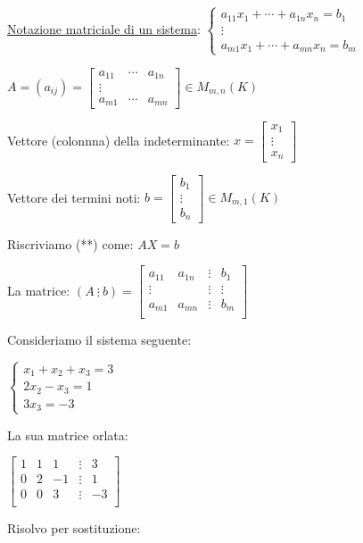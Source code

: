 \documentclass{article}
\newcommand{\ul}[1]{\underline{#1}}
\begin{document}
\ul{Notazione matriciale di un sistema}:
$\begin{cases}
		a_{11}x_1+\cdots+a_{1n}x_n=b_1 \\
		\vdots                         \\
		a_{m1}x_1+\cdots+a_{mn}x_n=b_m
	\end{cases}$

$A=(a_{ij})=\begin{bmatrix}
		a_{11} & \cdots & a_{1n} \\
		\vdots                   \\
		a_{m1} & \cdots & a_{mn}
	\end{bmatrix}\in M_{m,n}(K)$

Vettore (colonnna) della indeterminante:
$x=\begin{bmatrix}x_1\\\vdots\\x_n\end{bmatrix}$

Vettore dei termini noti: $b=\begin{bmatrix}b_1\\\vdots\\b_n\end{bmatrix}\in M_{m,1}(K)$

Riscriviamo (**) come:
$AX=b$

La matrice: $(A\ \vdots\ b)=\begin{bmatrix}
		a_{11} & a_{1n} & \vdots & b_1    \\
		\vdots &        & \vdots & \vdots \\
		a_{m1} & a_{mn} & \vdots & b_m    \\
	\end{bmatrix}$

Consideriamo il sistema seguente:

$\begin{cases}
		x_1+x_2+x_3=3 \\
		2x_2-x_3=1    \\
		3x_3=-3
	\end{cases}$

La sua matrice orlata:

$\begin{bmatrix}
		1 & 1 & 1  & \vdots & 3  \\
		0 & 2 & -1 & \vdots & 1  \\
		0 & 0 & 3  & \vdots & -3 \\
	\end{bmatrix}$

Risolvo per sostituzione:
\end{document}
